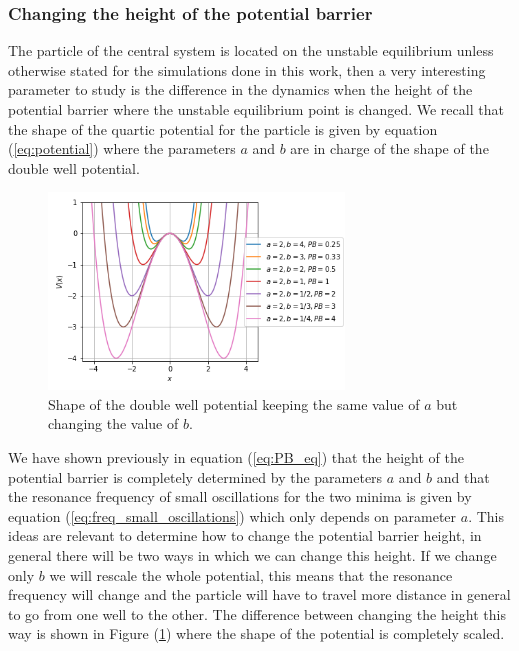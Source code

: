 \subsubsection{Changing the height of the potential barrier}
The particle of the central system is located on the unstable equilibrium unless otherwise stated for the simulations done in this work, then a very interesting parameter to study is the difference in the dynamics when the height of the potential barrier where the unstable equilibrium point is changed. We recall that the shape of the quartic potential for the particle is given by equation (\ref{eq:potential}) where the parameters $a$ and $b$ are in charge of the shape of the double well potential.\par 
\begin{figure}[H]
\centering
\includegraphics[width=0.7\textwidth]{Figures/double_well_PB_scale.png}
\caption{Shape of the double well potential keeping the same value of $a$ but changing the value of $b$.
}
\label{fig:PB_scale}
\end{figure} 

We have shown previously in equation (\ref{eq:PB_eq}) that the height of the potential barrier is completely determined by the parameters $a$ and $b$ and that the resonance frequency of small oscillations for the two minima is given by equation (\ref{eq:freq_small_oscillations}) which only depends on parameter $a$. This ideas are relevant to determine how to change the potential barrier height, in general there will be two ways in which we can change this height. If we change only $b$ we will rescale the whole potential, this means that the resonance frequency will change and the particle will have to travel more distance in general to go from one well to the other. The difference between changing the height this way is shown in Figure (\ref{fig:PB_scale}) where the shape of the potential is completely scaled.\par 

